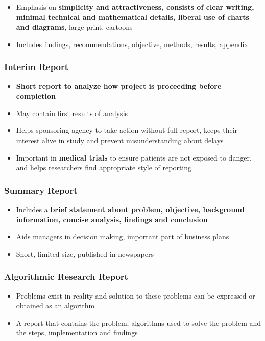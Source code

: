 \documentclass{article}
\begin{document}
\begin{itemize}
    \item Emphasis on \textbf{simplicity and attractiveness, consists of clear writing, minimal technical and mathematical details, liberal use of charts and diagrams}, large print, cartoons
    \item Includes findings, recommendations, objective, methods, results, appendix
\end{itemize}

\subsubsection{Interim Report}

\begin{itemize}
    \item \textbf{Short report to analyze how project is proceeding before completion}
    \item May contain first results of analysis
    \item Helps sponsoring agency to take action without full report, keeps their interest alive in study and prevent misunderstanding about delays
    \item Important in \textbf{medical trials} to ensure patients are not exposed to danger, and helps researchers find appropriate style of reporting
\end{itemize}

\subsubsection{Summary Report}

\begin{itemize}
    \item Includes a \textbf{brief statement about problem, objective, background information, concise analysis, findings and conclusion}
    \item Aids managers in decision making, important part of business plans
    \item Short, limited size, published in newspapers
\end{itemize}

\subsubsection{Algorithmic Research Report}

\begin{itemize}
    \item Problems exist in reality and solution to these problems can be expressed or obtained as an algorithm
    \item A report that contains the problem, algorithms used to solve the problem and the steps, implementation and findings
\end{itemize}
\end{document}
